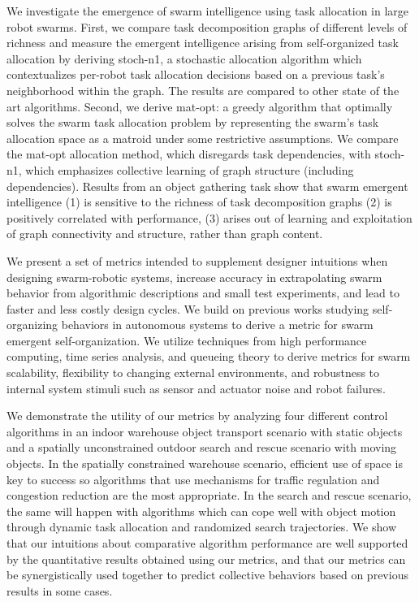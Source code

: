 

We investigate the emergence of swarm intelligence using task allocation in
large robot swarms. First, we compare task decomposition graphs of different
levels of richness and measure the emergent intelligence arising from
self-organized task allocation by deriving \gls{stoch-n1}, a stochastic allocation
algorithm which contextualizes per-robot task allocation decisions based on a
previous task's neighborhood within the graph. The results are compared to other
state of the art algorithms. Second, we derive \gls{mat-opt}: a greedy algorithm that
optimally solves the swarm task allocation problem by representing the swarm's
task allocation space as a matroid under some restrictive assumptions. We
compare the \gls{mat-opt} allocation method, which disregards task dependencies, with
\gls{stoch-n1}, which emphasizes collective learning of graph structure (including
dependencies). Results from an object gathering task show that swarm emergent
intelligence (1) is sensitive to the richness of task decomposition graphs (2)
is positively correlated with performance, (3) arises out of learning and
exploitation of graph connectivity and structure, rather than graph content.



We present a set of metrics intended to supplement designer intuitions when
designing swarm-robotic systems, increase accuracy in extrapolating swarm
behavior from algorithmic descriptions and small test experiments, and lead to
faster and less costly design cycles. We build on previous works studying
self-organizing behaviors in autonomous systems to derive a metric for swarm
emergent self-organization.  We utilize techniques from high performance
computing, time series analysis, and queueing theory to derive metrics for swarm
scalability, flexibility to changing external environments, and robustness to
internal system stimuli such as sensor and actuator noise and robot failures.

We demonstrate the utility of our metrics by analyzing four different control
algorithms in an indoor warehouse object transport scenario with static objects
and a spatially unconstrained outdoor search and rescue scenario with moving
objects. In the spatially constrained warehouse scenario, efficient use of space
is key to success so algorithms that use mechanisms for traffic regulation and
congestion reduction are the most appropriate.  In the search and rescue
scenario, the same will happen with algorithms which can cope well with object
motion through dynamic task allocation and randomized search trajectories. We
show that our intuitions about comparative algorithm performance are well
supported by the quantitative results obtained using our metrics, and that our
metrics can be synergistically used together to predict collective behaviors
based on previous results in some cases.
